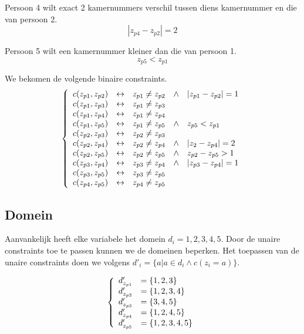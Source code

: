 \documentclass{article}
\begin{document}
Persoon 4 wilt exact 2 kamernummers verschil tussen diens kamernummer en die van persoon 2.
\[
|z_{p4} - z_{p2}| = 2
\]

Persoon 5 wilt een kamernummer kleiner dan die van persoon 1.
\[
z_{p5} < z_{p1}
\]

We bekomen de volgende binaire constraints.
\[
\left\lbrace
\begin{array}{c c c c l}
c(z_{p1}, z_{p2}) & \leftrightarrow & z_{p1} \neq z_{p2} & \wedge & |z_{p1} - z_{p2}| = 1\\
c(z_{p1}, z_{p3}) & \leftrightarrow & z_{p1} \neq z_{p3}\\
c(z_{p1}, z_{p4}) & \leftrightarrow & z_{p1} \neq z_{p4}\\
c(z_{p1}, z_{p5}) & \leftrightarrow & z_{p1} \neq z_{p5} & \wedge & z_{p5} < z_{p1}\\
c(z_{p2}, z_{p3}) & \leftrightarrow & z_{p2} \neq z_{p3}\\
c(z_{p2}, z_{p4}) & \leftrightarrow & z_{p2} \neq z_{p4} & \wedge & |z_{2} - z_{p4}| = 2\\
c(z_{p2}, z_{p5}) & \leftrightarrow & z_{p2} \neq z_{p5} & \wedge & z_{p2} - z_{p5} > 1\\
c(z_{p3}, z_{p4}) & \leftrightarrow & z_{p3} \neq z_{p4} & \wedge & |z_{p3} - z_{p4}| = 1\\
c(z_{p3}, z_{p5}) & \leftrightarrow & z_{p3} \neq z_{p5}\\
c(z_{p4}, z_{p5}) & \leftrightarrow & z_{p4} \neq z_{p5}\\


\end{array}
\right.
\]

\newpage
\subsection{Domein}
Aanvankelijk heeft elke variabele het domein $d_i = {1,2,3,4,5}$. Door de unaire constraints toe te passen kunnen we de domeinen beperken. Het toepassen van de unaire constraints doen we volgens  $d'_i = \{a|a \in d_i \wedge c(z_i = a)\}$.

\[
\left\lbrace
\begin{array}{c l}
d_{z_{p1}}' &= \{1,2,3\}\\
d_{z_{p2}}' &= \{1,2,3,4\}\\
d_{z_{p3}}' &= \{3,4,5\}\\
d_{z_{p4}}' &= \{1,2,4,5\}\\
d_{z_{p5}}' &= \{1,2,3,4,5\}\\
\end{array}
\right.
\]
\end{document}
